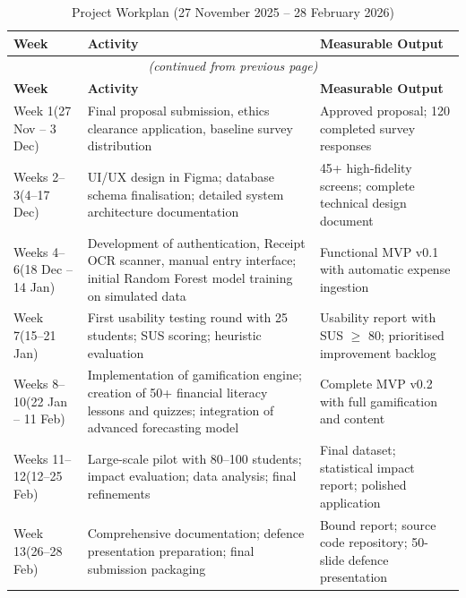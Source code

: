 \documentclass[12pt]{report}
\begin{document}
\begin{longtable}{p{2.2cm} p{4.5cm} p{5cm}}
\caption{Project Workplan (27 November 2025 -- 28 February 2026)}
\label{tab:workplan}\\
\toprule
\textbf{Week} & \textbf{Activity} & \textbf{Measurable Output} \\
\midrule
\endfirsthead
\multicolumn{3}{c}{\small\itshape (continued from previous page)}\\
\toprule
\textbf{Week} & \textbf{Activity} & \textbf{Measurable Output} \\
\midrule
\endhead
\bottomrule
\endfoot
\bottomrule
\endlastfoot
Week 1\newline(27 Nov -- 3 Dec) & Final proposal submission, ethics clearance application, baseline survey distribution & Approved proposal; 120 completed survey responses \\[4pt]
Weeks 2--3\newline(4--17 Dec) & UI/UX design in Figma; database schema finalisation; detailed system architecture documentation & 45+ high-fidelity screens; complete technical design document \\[4pt]
Weeks 4--6\newline(18 Dec -- 14 Jan) & Development of authentication, Receipt OCR scanner, manual entry interface; initial Random Forest model training on simulated data & Functional MVP v0.1 with automatic expense ingestion \\[4pt]
Week 7\newline(15--21 Jan) & First usability testing round with 25 students; SUS scoring; heuristic evaluation & Usability report with SUS $\geq$ 80; prioritised improvement backlog \\[4pt]
Weeks 8--10\newline(22 Jan -- 11 Feb) & Implementation of gamification engine; creation of 50+ financial literacy lessons and quizzes; integration of advanced forecasting model & Complete MVP v0.2 with full gamification and content \\[4pt]
Weeks 11--12\newline(12--25 Feb) & Large-scale pilot with 80--100 students; impact evaluation; data analysis; final refinements & Final dataset; statistical impact report; polished application \\[4pt]
Week 13\newline(26--28 Feb) & Comprehensive documentation; defence presentation preparation; final submission packaging & Bound report; source code repository; 50-slide defence presentation \\
\end{longtable}
\end{document}
